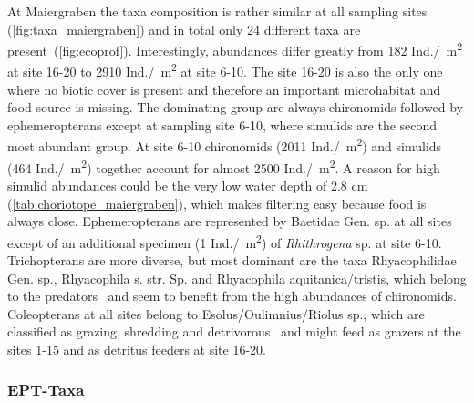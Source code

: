 At Maiergraben the taxa composition is rather similar at all sampling sites (\cref{fig:taxa_maiergraben}) and in total only 24 different taxa are present~(\cref{fig:ecoprof}). Interestingly, abundances differ greatly from 182 Ind./\SI{}{\square\meter} at site 16-20 to 2910 Ind./\SI{}{\square\meter} at site 6-10. The site 16-20 is also the only one where no biotic cover is present and therefore an important microhabitat and food source is missing. The dominating group are always chironomids followed by ephemeropterans except at sampling site 6-10, where simulids are the second most abundant group. At site 6-10 chironomids (2011 Ind./\SI{}{\square\meter}) and simulids (464 Ind./\SI{}{\square\meter}) together account for almost 2500 Ind./\SI{}{\square\meter}. A reason for high simulid abundances could be the very low water depth of 2.8 cm (\cref{tab:choriotope_maiergraben}), which makes filtering easy because food is always close. Ephemeropterans are represented by Baetidae Gen. sp. at all sites except of an additional specimen (1 Ind./\SI{}{\square\meter}) of \emph{Rhithrogena} sp. at site 6-10. Trichopterans are more diverse, but most dominant are the taxa Rhyacophilidae Gen. sp., Rhyacophila s. str. Sp. and Rhyacophila aquitanica/tristis, which belong to the predators~\parencite{Graf2002a} and seem to benefit from the high abundances of chironomids. Coleopterans at all sites belong to Esolus/Oulimnius/Riolus sp., which are classified as grazing, shredding and detrivorous~\parencite{Jach2002} and might feed as grazers at the sites 1-15 and as detritus feeders at site 16-20.




\subsubsection{EPT-Taxa}\label{sec:ept_taxa_discussion}                      %

